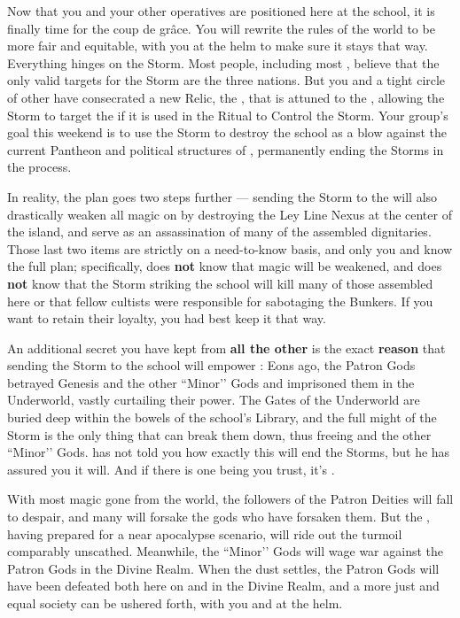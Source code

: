 \documentclass[char]{GL2020}
\begin{document}
Now that you and your other operatives are positioned here at the school, it is finally time for the coup de grâce. You will rewrite the rules of the world to be more fair and equitable, with you at the helm to make sure it stays that way. Everything hinges on the Storm. Most people, including most \pGoaties{}, believe that the only valid targets for the Storm are the three nations. But you and a tight circle of other \pGoaties{} have consecrated a new Relic, the \iHorseshoe{}, that is attuned to the \pSchool{}, allowing the Storm to target the \pSc{} if it is used in the Ritual to Control the Storm. Your group's goal this weekend is to use the Storm to destroy the school as a blow against the current Pantheon and political structures of \pEarth{}, permanently ending the Storms in the process. 

In reality, the plan goes two steps further — sending the Storm to the \pSc{} will also drastically weaken all magic on \pEarth{} by destroying the Ley Line Nexus at the center of the island, and serve as an assassination of many of the assembled dignitaries. Those last two items are strictly on a need-to-know basis, and only you and \cChupSecond{} know the full plan; specifically, \cChupInventor{} does \textbf{not} know that magic will be weakened, and \cChupstudent{} does \textbf{not} know that the Storm striking the school will kill many of those assembled here or that \cChupstudent{\their} fellow cultists were responsible for sabotaging the Bunkers. If you want to retain their loyalty, you had best keep it that way. 

An additional secret you have kept from \textbf{all the other} \pGoaties{} is the exact \textbf{reason} that sending the Storm to the school will empower \cGenesis{}: Eons ago, the Patron Gods betrayed Genesis and the other ``Minor’’ Gods and imprisoned them in the Underworld, vastly curtailing their power. The Gates of the Underworld are buried deep within the bowels of the school’s Library, and the full might of the Storm is the only thing that can break them down, thus freeing \cGenesis{} and the other ``Minor’’ Gods. \cGenesis{} has not told you how exactly this will end the Storms, but he has assured you it will. And if there is one being you trust, it's \cGenesis{}.

With most magic gone from the world, the followers of the Patron Deities will fall to despair, and many will forsake the gods who have forsaken them. But the \pGoaties{}, having prepared for a near apocalypse scenario, will ride out the turmoil comparably unscathed. Meanwhile, the ``Minor’’ Gods will wage war against the Patron Gods in the Divine Realm. When the dust settles, the Patron Gods will have been defeated both here on \pEarth{} and in the Divine Realm, and a more just and equal society can be ushered forth, with you and \cGenesis{} at the helm.
\end{document}
